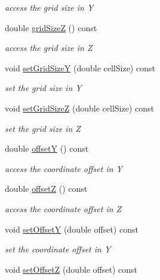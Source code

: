 \begin{DoxyCompactItemize}
\begin{DoxyCompactList}\small\item\em access the grid size in Y \end{DoxyCompactList}\item 
double \hyperlink{class_d_d4hep_1_1_geometry_1_1_cartesian_grid_y_z_a44c11c7e8c4a96a718819b2727312912}{grid\+SizeZ} () const
\begin{DoxyCompactList}\small\item\em access the grid size in Z \end{DoxyCompactList}\item 
void \hyperlink{class_d_d4hep_1_1_geometry_1_1_cartesian_grid_y_z_a0acf6f4efeac643d8417497baa15cec2}{set\+Grid\+SizeY} (double cell\+Size) const
\begin{DoxyCompactList}\small\item\em set the grid size in Y \end{DoxyCompactList}\item 
void \hyperlink{class_d_d4hep_1_1_geometry_1_1_cartesian_grid_y_z_ab904fec573166268aa54888d3857256b}{set\+Grid\+SizeZ} (double cell\+Size) const
\begin{DoxyCompactList}\small\item\em set the grid size in Z \end{DoxyCompactList}\item 
double \hyperlink{class_d_d4hep_1_1_geometry_1_1_cartesian_grid_y_z_a60d3f414130a8ceca2e4dd937d74eaf8}{offsetY} () const
\begin{DoxyCompactList}\small\item\em access the coordinate offset in Y \end{DoxyCompactList}\item 
double \hyperlink{class_d_d4hep_1_1_geometry_1_1_cartesian_grid_y_z_a6d938eec80202b43db2d0073308a5ec5}{offsetZ} () const
\begin{DoxyCompactList}\small\item\em access the coordinate offset in Z \end{DoxyCompactList}\item 
void \hyperlink{class_d_d4hep_1_1_geometry_1_1_cartesian_grid_y_z_a7c994c12c408be044ee7d1a73bae1fda}{set\+OffsetY} (double offset) const
\begin{DoxyCompactList}\small\item\em set the coordinate offset in Y \end{DoxyCompactList}\item 
void \hyperlink{class_d_d4hep_1_1_geometry_1_1_cartesian_grid_y_z_ae40cf06145d7a3679b7f370924e59953}{set\+OffsetZ} (double offset) const

\end{DoxyCompactItemize}
